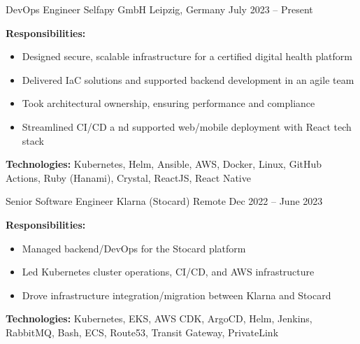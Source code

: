 
\begin{cventries}

\cventry
  {DevOps Engineer}
  {Selfapy GmbH}
  {Leipzig, Germany}
  {July 2023 – Present}
  {
    \begin{cvitems}
      \item {\textbf{Responsibilities:}
        \begin{itemize}
          \item Designed secure, scalable infrastructure for a certified digital health platform
          \item Delivered IaC solutions and supported backend development in an agile team
          \item Took architectural ownership, ensuring performance and compliance
          \item Streamlined CI/CD a nd supported web/mobile deployment with React tech stack\\
        \end{itemize}
      }
      \item {\textbf{Technologies:} Kubernetes, Helm, Ansible, AWS, Docker, Linux, GitHub Actions, Ruby (Hanami), Crystal, ReactJS, React Native}\\
    \end{cvitems}
  }

\cventry
  {Senior Software Engineer}
  {Klarna (Stocard)}
  {Remote}
  {Dec 2022 – June 2023}
  {
    \begin{cvitems}
      \item {\textbf{Responsibilities:}
        \begin{itemize}
          \item Managed backend/DevOps for the Stocard platform
          \item Led Kubernetes cluster operations, CI/CD, and AWS infrastructure
          \item Drove infrastructure integration/migration between Klarna and Stocard\\
        \end{itemize}
      }
      \item {\textbf{Technologies:} Kubernetes, EKS, AWS CDK, ArgoCD, Helm, Jenkins, RabbitMQ, Bash, ECS, Route53, Transit Gateway, PrivateLink}\\
    \end{cvitems}
  }


\end{cventries}
